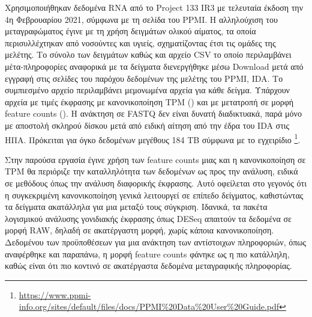 \documentclass[12pt]{report}
\makeatletter
\let\oldchapter\chapter
\renewcommand{\chapter}{\@ifstar{\starchapter}{\nostarchapter}}
\newcommand{\starchapter}[1]{\oldchapter*{#1}\thispagestyle{mainstyle}}
\newcommand{\nostarchapter}[1]{\oldchapter{#1}\thispagestyle{mainstyle}}
\let\oldfootnote\footnote
\renewcommand{\footnote}[1]{\oldfootnote{\onehalfspacing #1}}
\makeatother
\begin{document}
    \chapter{Μέθοδοι}
    \par
        Χρησιμοποιήθηκαν δεδομένα RNA από το Project 133 IR3 με τελευταία έκδοση την 4η Φεβρουαρίου 2021, σύμφωνα με τη σελίδα του PPMI. Η αλληλούχιση του μεταγραφώματος έγινε με τη χρήση δειγμάτων ολικού αίματος, τα οποία περισυλλέχτηκαν από νοσούντες και υγιείς, σχηματίζοντας έτσι τις ομάδες της μελέτης. Το σύνολο των δειγμάτων καθώς και αρχείο CSV το οποίο περιλαμβάνει μέτα-πληροφορίες αναφορικά με τα δείγματα διενεργήθηκε μέσω Download μετά από εγγραφή στις σελίδες του παρόχου δεδομένων της μελέτης του PPMI, IDA. Το συμπιεσμένο αρχείο περιλαμβάνει μεμονωμένα αρχεία για κάθε δείγμα. Υπάρχουν αρχεία με τιμές έκφρασης με κανονικοποίηση TPM (\emph{\cite{Zhao2021TPMRepository}}) και με μετατροπή σε μορφή feature counts (\emph{\cite{Liao2014FeatureCounts:Features}}). Η ανάκτηση σε FASTQ  δεν είναι δυνατή διαδικτυακά, παρά μόνο με αποστολή σκληρού δίσκου μετά από ειδική αίτηση από την έδρα του IDA στις ΗΠΑ. Πρόκειται για όγκο δεδομένων μεγέθους 184 TB σύμφωνα με το εγχειρίδιο \footnote{\url{https://www.ppmi-info.org/sites/default/files/docs/PPMI\%20Data\%20User\%20Guide.pdf}}.
    \par
        Στην παρούσα εργασία έγινε χρήση των feature counts μιας και η κανονικοποίηση σε TPM θα περιόριζε την καταλληλότητα των δεδομένων ως προς την ανάλυση, ειδικά σε μεθόδους όπως την ανάλυση διαφορικής έκφρασης. Αυτό οφείλεται στο γεγονός ότι η συγκεκριμένη κανονικοποίηση γενικά λειτουργεί σε επίπεδο δείγματος, καθιστώντας τα δείγματα ακατάλληλα για μια μεταξύ τους σύγκριση. Ιδανικά, τα πακέτα λογισμικού ανάλυσης γονιδιακής έκφρασης όπως DESeq απαιτούν τα δεδομένα σε μορφή RAW, δηλαδή σε ακατέργαστη μορφή, χωρίς κάποια κανονικοποίηση. Δεδομένου των προϋποθέσεων για μια ανάκτηση των αντίστοιχων πληροφοριών, όπως αναφέρθηκε και παραπάνω, η μορφή feature counts φάνηκε ως η πιο κατάλληλη, καθώς είναι ότι πιο κοντινό σε ακατέργαστα δεδομένα μεταγραφικής πληροφορίας.
        
\end{document}
